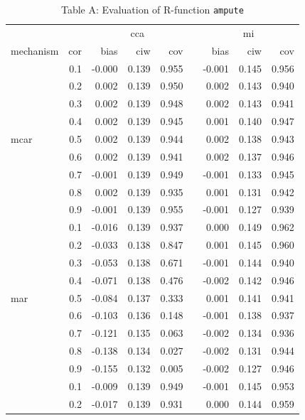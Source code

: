 \documentclass[11pt,a4paper]{article}
\newcommand{\code}[1]{\texttt{#1}}
\begin{document}
\begin{table}[h!]
\centering
\captionsetup{justification=justified,singlelinecheck=false,width = 0.73\textwidth}
\caption*{\normalsize Table A: Evaluation of R-function \code{ampute}}
  \label{A}
\begin{tabular}{lrrrrrrrr}
  \hline
&& \multicolumn{3}{c}{cca} && \multicolumn{3}{c}{mi} \\
\cline{3-5} \cline{7-9}
mechanism & cor & bias & ciw & cov && bias & ciw & cov \\
\hline
 & 0.1 & -0.000 & 0.139 & 0.955 &  & -0.001 & 0.145 & 0.956 \\ 
   & 0.2 & 0.002 & 0.139 & 0.950 &  & 0.002 & 0.143 & 0.940 \\ 
   & 0.3 & 0.002 & 0.139 & 0.948 &  & 0.002 & 0.143 & 0.941 \\ 
   & 0.4 & 0.002 & 0.139 & 0.945 &  & 0.001 & 0.140 & 0.947 \\ 
  mcar & 0.5 & 0.002 & 0.139 & 0.944 &  & 0.002 & 0.138 & 0.943 \\ 
   & 0.6 & 0.002 & 0.139 & 0.941 &  & 0.002 & 0.137 & 0.946 \\ 
   & 0.7 & -0.001 & 0.139 & 0.949 &  & -0.001 & 0.133 & 0.945 \\ 
   & 0.8 & 0.002 & 0.139 & 0.935 &  & 0.001 & 0.131 & 0.942 \\ 
   & 0.9 & -0.001 & 0.139 & 0.955 &  & -0.001 & 0.127 & 0.939 \\ 
   \cline{2-9}
   & 0.1 & -0.016 & 0.139 & 0.937 &  & 0.000 & 0.149 & 0.962 \\ 
   & 0.2 & -0.033 & 0.138 & 0.847 &  & 0.001 & 0.145 & 0.960 \\ 
   & 0.3 & -0.053 & 0.138 & 0.671 &  & -0.001 & 0.144 & 0.940 \\ 
   & 0.4 & -0.071 & 0.138 & 0.476 &  & -0.002 & 0.142 & 0.946 \\ 
  mar & 0.5 & -0.084 & 0.137 & 0.333 &  & 0.001 & 0.141 & 0.941 \\ 
   & 0.6 & -0.103 & 0.136 & 0.148 &  & -0.001 & 0.138 & 0.937 \\ 
   & 0.7 & -0.121 & 0.135 & 0.063 &  & -0.002 & 0.134 & 0.936 \\ 
   & 0.8 & -0.138 & 0.134 & 0.027 &  & -0.002 & 0.131 & 0.944 \\ 
   & 0.9 & -0.155 & 0.132 & 0.005 &  & -0.002 & 0.127 & 0.946 \\ 
   \cline{2-9}
   & 0.1 & -0.009 & 0.139 & 0.949 &  & -0.001 & 0.145 & 0.953 \\ 
   & 0.2 & -0.017 & 0.139 & 0.931 &  & 0.000 & 0.144 & 0.959 \\ 

\end{tabular}
\end{table}
\end{document}
